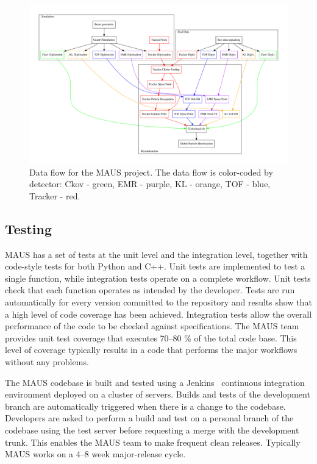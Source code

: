\documentclass[11pt,a4paper]{article}
\begin{document}
\begin{figure}[htbp]
  \centering
  \includegraphics[width=0.9\textheight, angle=90, origin=c]{figs/maus_process_diagram.pdf}
  \caption{Data flow for the MAUS project. The data flow is color-coded by detector: Ckov - green, EMR - purple, KL - orange, TOF - blue, Tracker - red. }
  \label{fig:maus_process_diagram}
\end{figure}

\subsection{Testing}\label{sec:maus-tests}
MAUS has a set of tests at the unit level and the integration level, together with code-style tests for both Python and C++. Unit tests are implemented to test a single function, while integration tests operate on a complete workflow. Unit tests check that each function operates as intended by the developer. Tests are run automatically for every version committed to the repository and results show that a high level of code coverage has been achieved. Integration tests allow the overall performance of the code to be checked against specifications. The MAUS team provides unit test coverage that executes 70--80 $\%$ of the total code base. This level of coverage typically results in a code that performs the major workflows without any problems.

The MAUS codebase is built and tested using a Jenkins~\cite{Jenkins} continuous integration environment deployed on a cluster of servers. Builds and tests of the development branch are automatically triggered when there is a change to the codebase.  Developers are asked to perform a build and test on a personal branch of the codebase using the test server before requesting a merge with the development trunk. This enables the MAUS team to make frequent clean releases. Typically MAUS works on a 4--8 week major-release cycle.
\end{document}
